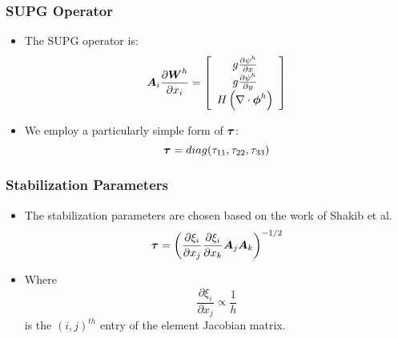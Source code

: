 \begin{frame}[t]
  \frametitle{SUPG Operator}
  \begin{itemize}%
    \item{The SUPG operator is: 
      \begin{equation}
	\nonumber
   \bv{A}_i\frac{\partial \bv{W}^h}{\partial x_i} =
   \begin{bmatrix}
     \renewcommand{\arraystretch}{1.3}
     \begin{array}{c}
       g \frac{\partial \psi^h}{\partial x} \\
       g \frac{\partial \psi^h}{\partial y} \\
       H \left( \nabla \cdot \bv{\phi}^h \right) \\
     \end{array}
   \end{bmatrix}
\end{equation}
      }

    \item{
      We employ a particularly simple form of ${\boldsymbol{\tau}}$:
\begin{equation}
  \nonumber
{\boldsymbol{\tau}} = diag(\tau_{11}, \tau_{22}, \tau_{33})
\end{equation}
    }
  \end{itemize}
\end{frame}


\begin{frame}[t]
  \frametitle{Stabilization Parameters}
  \begin{itemize}%
    \item{The stabilization parameters are chosen based on
      the work of Shakib et al.
      \begin{equation}
	\nonumber
  {\boldsymbol{\tau}} = \left(
  \frac{\partial \xi_i}{\partial x_j}
  \frac{\partial \xi_i}{\partial x_k}
  {\boldsymbol{A}}_j{\boldsymbol{A}}_k 
\right)^{-1/2}
      \end{equation}
      }
      \item{Where
	\begin{equation}
	  \nonumber
	  \frac{\partial \xi_i}{\partial x_j} \propto \frac{1}{h}
	\end{equation}
	is the $(i,j)^{th}$ entry of the element
Jacobian matrix.}
  \end{itemize}
\end{frame}

